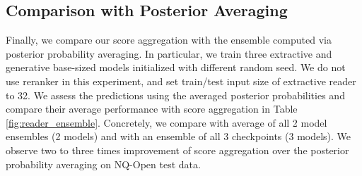 \documentclass[11pt]{article}
\begin{document}
\subsection{Comparison with Posterior Averaging}
Finally, we compare our score aggregation with the ensemble computed via posterior probability averaging. In particular, we train three extractive and generative base-sized models initialized with different random seed. We do not use reranker in this experiment, and set train/test input size of extractive reader to 32. We assess the predictions using the averaged posterior probabilities and compare their average performance with score aggregation in Table \ref{fig:reader_ensemble}. Concretely, we compare with average of all 2 model ensembles (2 models) and with an ensemble of all 3 checkpoints (3 models). We observe two to three times improvement of score aggregation over the posterior probability averaging on NQ-Open test data.
\end{document}

